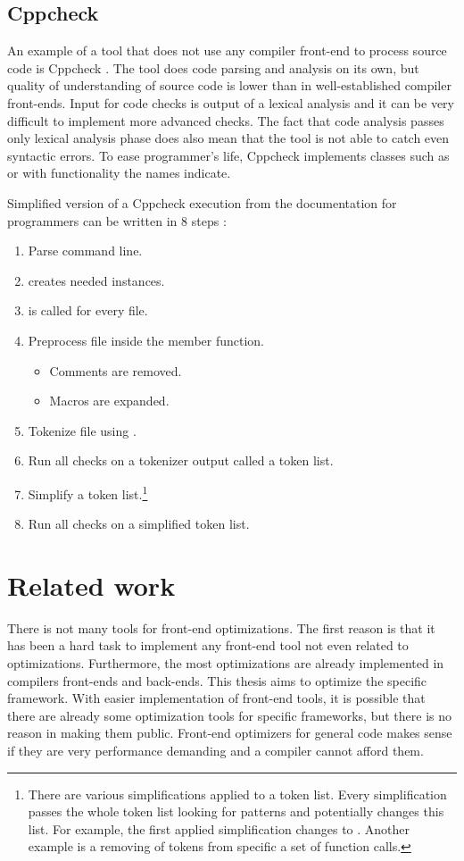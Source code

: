 \subsection{Cppcheck}
An example of a tool that does not use any compiler front-end to process source code is Cppcheck \cite{cppcheck}. The tool does code parsing and analysis on its own, but quality of understanding of source code is lower than in well-established compiler front-ends. Input for code checks is output of a lexical analysis and it can be very difficult to implement more advanced checks. The fact that code analysis passes only lexical analysis phase does also mean that the tool is not able to catch even syntactic errors. To ease programmer's life, Cppcheck implements classes such as  or  with functionality the names indicate.

Simplified version of a Cppcheck execution from the documentation for programmers can be written in 8 steps \cite{cppcheck-doxygen}:

\begin{enumerate}
\item Parse command line.
\item {} creates needed  instances.
\item {} is called for every file.
\item Preprocess file inside the  member function.
    \begin{itemize}
    \item Comments are removed.
    \item Macros are expanded.
    \end{itemize}
\item Tokenize file using .
\item Run all checks on a tokenizer output called a token list.
\item Simplify a token list.\footnote{There are various simplifications applied to a token list. Every simplification passes the whole token list looking for patterns and potentially changes this list. For example, the first applied simplification changes  to . Another example is a removing of  tokens from specific a set of function calls.}
\item Run all checks on a simplified token list.
\end{enumerate}

\section{Related work}
There is not many tools for front-end optimizations. The first reason is that it has been a hard task to implement any front-end tool not even related to optimizations. Furthermore, the most optimizations are already implemented in compilers front-ends and back-ends. This thesis aims to optimize the specific framework. With easier implementation of front-end tools, it is possible that there are already some optimization tools for specific frameworks, but there is no reason in making them public. Front-end optimizers for general code makes sense if they are very performance demanding and a compiler cannot afford them.

